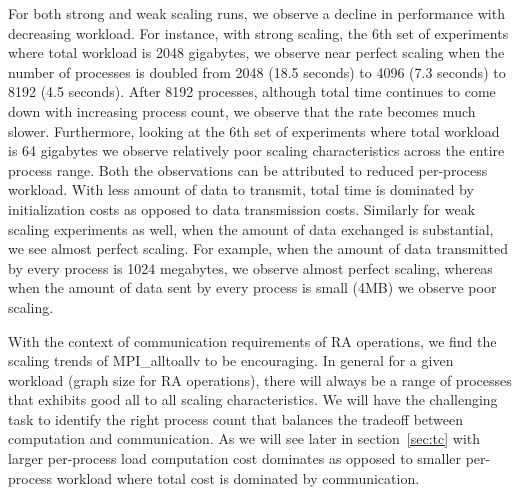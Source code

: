 For both strong and weak scaling runs, we observe a decline in performance with decreasing workload. For instance, with strong scaling, the 6th set of experiments where total workload is 2048 gigabytes, we observe near perfect scaling when the number of processes is doubled from 2048 (18.5 seconds) to 4096 (7.3 seconds) to 8192 (4.5 seconds). After 8192 processes, although total time continues to come down with increasing process count, we observe that the rate becomes much slower. Furthermore, looking at the 6th set of experiments where total workload is 64 gigabytes we observe relatively poor scaling characteristics across the entire process range. Both the observations can be attributed to reduced per-process workload. With less amount of data to transmit, total time is dominated by initialization costs as opposed to data transmission costs. Similarly for weak scaling experiments as well, when the amount of data exchanged is substantial, we see almost perfect scaling. For example, when the amount of data transmitted by every process is 1024 megabytes, we observe almost perfect scaling, whereas when the amount of data sent by every process is small (4MB) we observe poor scaling.


With the context of communication requirements of RA operations, we find the scaling trends of MPI\_alltoallv to be encouraging. In general for a given workload (graph size for RA operations), there will always be a range of processes that exhibits good all to all scaling characteristics. We will have the challenging task to identify the right process count that balances the tradeoff between computation and communication. As we will see later in section~\ref{sec:tc} with larger per-process load computation cost dominates as opposed to smaller per-process workload where total cost is dominated by communication. 



